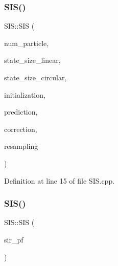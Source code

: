 \subsubsection{\texorpdfstring{S\+I\+S()}{SIS()}\hspace{0.1cm}{\footnotesize\ttfamily [2/3]}}
{\footnotesize\ttfamily S\+I\+S\+::\+S\+IS (\begin{DoxyParamCaption}\item[{unsigned int}]{num\+\_\+particle,  }\item[{std\+::size\+\_\+t}]{state\+\_\+size\+\_\+linear,  }\item[{std\+::size\+\_\+t}]{state\+\_\+size\+\_\+circular,  }\item[{std\+::unique\+\_\+ptr$<$ \mbox{\hyperlink{classbfl_1_1ParticleSetInitialization}{Particle\+Set\+Initialization}} $>$}]{initialization,  }\item[{std\+::unique\+\_\+ptr$<$ \mbox{\hyperlink{classbfl_1_1PFPrediction}{P\+F\+Prediction}} $>$}]{prediction,  }\item[{std\+::unique\+\_\+ptr$<$ \mbox{\hyperlink{classbfl_1_1PFCorrection}{P\+F\+Correction}} $>$}]{correction,  }\item[{std\+::unique\+\_\+ptr$<$ \mbox{\hyperlink{classbfl_1_1Resampling}{Resampling}} $>$}]{resampling }\end{DoxyParamCaption})\hspace{0.3cm}{\ttfamily [noexcept]}}



Definition at line 15 of file S\+I\+S.\+cpp.

\mbox{\label{classbfl_1_1SIS_af66e323d22b28f497152f2e3a65290ff}} 
\subsubsection{\texorpdfstring{S\+I\+S()}{SIS()}\hspace{0.1cm}{\footnotesize\ttfamily [3/3]}}
{\footnotesize\ttfamily S\+I\+S\+::\+S\+IS (\begin{DoxyParamCaption}\item[{\mbox{\hyperlink{classbfl_1_1SIS}{S\+IS}} \&\&}]{sir\+\_\+pf }\end{DoxyParamCaption})\hspace{0.3cm}{\ttfamily [noexcept]}}



